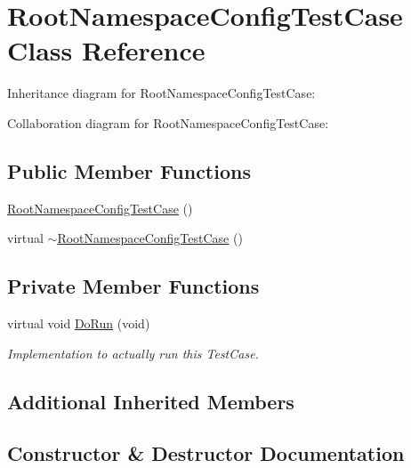 \hypertarget{classRootNamespaceConfigTestCase}{}\section{Root\+Namespace\+Config\+Test\+Case Class Reference}
\label{classRootNamespaceConfigTestCase}


Inheritance diagram for Root\+Namespace\+Config\+Test\+Case\+:


Collaboration diagram for Root\+Namespace\+Config\+Test\+Case\+:
\subsection*{Public Member Functions}
\begin{DoxyCompactItemize}
\item 
\hyperlink{classRootNamespaceConfigTestCase_af5c7fc6adeaae7b1ce34a9662400d194}{Root\+Namespace\+Config\+Test\+Case} ()
\item 
virtual \hyperlink{classRootNamespaceConfigTestCase_a494280471e5a2361475b82edfedac1a6}{$\sim$\+Root\+Namespace\+Config\+Test\+Case} ()
\end{DoxyCompactItemize}
\subsection*{Private Member Functions}
\begin{DoxyCompactItemize}
\item 
virtual void \hyperlink{classRootNamespaceConfigTestCase_a053942cb6577be15003d8ab5594ef70c}{Do\+Run} (void)
\begin{DoxyCompactList}\small\item\em Implementation to actually run this Test\+Case. \end{DoxyCompactList}\end{DoxyCompactItemize}
\subsection*{Additional Inherited Members}


\subsection{Constructor \& Destructor Documentation}
